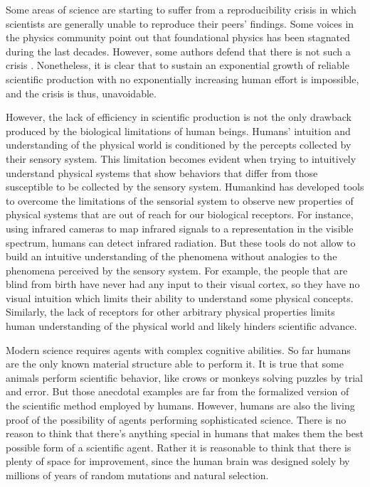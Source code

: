 \documentclass[11pt,a4paper,twoside]{report}
\newcommand{\+}{\textnormal{+} }
\theoremstyle{definition}
\numberwithin{equation}{chapter}
\begin{document}
Some areas of science are starting to suffer from a reproducibility crisis
\cite{Saltelli, begley2012raise} in which scientists are generally unable to
reproduce their peers' findings. Some voices in the physics community
\cite{Sabine} point out that foundational physics has been stagnated during the
last decades. However, some authors defend that there is not such a crisis
\cite{Fanelli2628}. Nonetheless, it is clear that to sustain an exponential
growth of reliable scientific production with no exponentially increasing human 
effort is impossible, and the crisis is thus, unavoidable.
 \par
However, the lack of efficiency in scientific production is not the only
drawback produced by the biological limitations of human beings. Humans'
intuition and understanding of the physical world is conditioned by the percepts
collected by their sensory system. This limitation becomes evident when trying
to intuitively understand physical systems that show behaviors that differ from
those susceptible to be collected by the sensory system. Humankind has developed
tools to overcome the limitations of the sensorial system to observe new
properties of physical systems that are out of reach for our biological
receptors. For instance, using infrared cameras to map infrared signals to a
representation in the visible spectrum, humans can detect infrared radiation.
But these tools do not allow to build an intuitive understanding of the
phenomena without analogies to the phenomena perceived by the sensory system.
For example, the people that are blind from birth have never had any input to their
visual cortex, so they have no visual intuition which limits their ability to
understand some physical concepts. Similarly, the lack of receptors for other
arbitrary physical properties limits human understanding of the physical world
and likely hinders scientific advance. \\ 
\par 
Modern science requires agents with complex cognitive abilities. So far
humans are the only known material structure able to perform it. It is true that
some animals perform scientific behavior, like crows or monkeys solving puzzles
by trial and error. But those anecdotal examples are far from the formalized
version of the scientific method employed by humans. However, humans are also
the living proof of the possibility of agents performing sophisticated science.
There is no reason to think that there's anything special in humans that makes
them the best possible form of a scientific agent. Rather it is reasonable to
think that there is plenty of space for improvement, since the human brain was
designed solely by millions of years of random mutations and natural selection.
\end{document}
